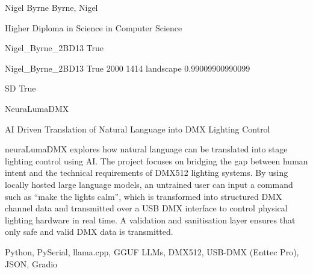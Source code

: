 \documentclass[twoside]{report}
\begin{document}
\begingroup{}\relax



\def\Key{Nigel_Byrne_2BD13}

{Nigel Byrne}
{Byrne, Nigel}

{Higher Diploma in Science in Computer Science}

{Nigel_Byrne_2BD13}
{True}

{Nigel_Byrne_2BD13}
{True}
{2000}
{1414}
{landscape}
{0.99009900990099}

{SD}
{True}

{NeuraLumaDMX}

{AI Driven Translation of Natural Language into DMX Lighting Control}

{neuraLumaDMX explores how natural language can be translated into stage lighting control using AI. The project focuses on bridging the gap between human intent and the technical requirements of DMX512 lighting systems. By using locally hosted large language models, an untrained user can input a command such as “make the lights calm”, which is transformed into structured DMX channel data and transmitted over a USB DMX interface to control physical lighting hardware in real time. A validation and sanitisation layer ensures that only safe and valid DMX data is transmitted.}

{Python, PySerial, llama.cpp, GGUF LLMs, DMX512, USB-DMX (Enttec Pro), JSON, Gradio}
\end{document}
